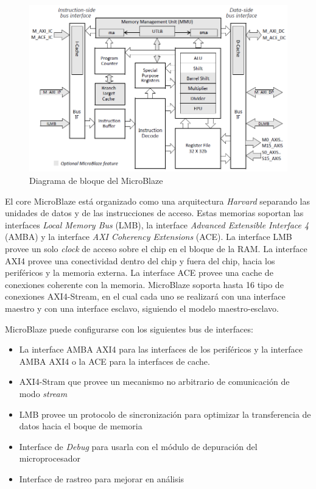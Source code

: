 \documentclass[a4paper,openright,12pt]{report}
\begin{document}
\begin{figure}[H]
\centering
\includegraphics[width=145mm]{img/microblaze.png}
\caption{Diagrama de bloque del MicroBlaze \label{overflow}}
   \label{MicroB}
   \end{figure}
   

El core MicroBlaze está organizado como una arquitectura \textit{Harvard} separando las unidades  de datos y de las instrucciones de acceso. Estas memorias soportan  las interfaces \textit{Local Memory Bus} (LMB), la interface \textit{Advanced Extensible Interface 4} (AMBA)   y la interface \textit{AXI Coherency Extensions} (ACE).
La interface LMB provee un solo \textit{clock} de acceso sobre el chip en el bloque de la RAM. La interface  AXI4 provee una conectividad  dentro del chip y fuera del chip, hacia los periféricos y la memoria externa. La interface ACE provee una cache de conexiones coherente con la memoria. MicroBlaze  soporta hasta 16 tipo de conexiones AXI4-Stream, en el cual cada uno se realizará con una interface maestro y con una interface esclavo, siguiendo el modelo maestro-esclavo.

MicroBlaze puede configurarse con los siguientes bus de interfaces:
\begin{itemize}
\item La interface AMBA AXI4 para las interfaces de los periféricos y la interface AMBA AXI4 o la ACE  para la interfaces de cache.
\item AXI4-Stram  que provee un mecanismo no arbitrario de comunicación de modo \textit{stream}
\item LMB  provee un protocolo de sincronización para optimizar la transferencia de datos hacia el boque de memoria
\item Interface de \textit{Debug} para usarla con el módulo de depuración  del microprocesador 
\item Interface de rastreo para mejorar en análisis 
\end{itemize}
\end{document}
